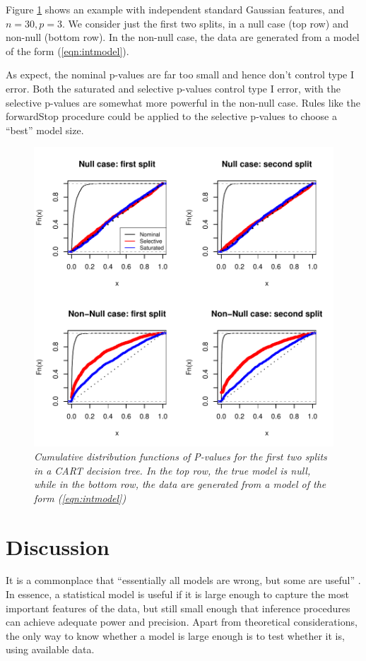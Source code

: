 \documentclass{article}
\begin{document}
Figure \ref{fig:cart} shows an example with independent standard Gaussian features, and $n=30, p=3$.
We 
consider just the first two splits, in a null case (top row) and non-null (bottom row).
In the non-null case,  the data are generated from a  model of the form (\ref{eqn:intmodel}).

As expect, the nominal p-values are far too small and hence don't control type I error.
Both the saturated and selective p-values control type I error, with the selective p-values are somewhat more powerful in the non-null case.
Rules like the forwardStop procedure could be applied  to the selective p-values to choose a ``best'' model size.
\begin{figure}[h]
  \centering
  \includegraphics[width=.65\textwidth]{figs/cart.pdf}
  \caption{\em Cumulative distribution functions of P-values for  the first two splits in a CART decision tree. In the top row, the true model is null,
  while in the bottom row, the data are generated from a  model of the form (\ref{eqn:intmodel})}
  \label{fig:cart}
\end{figure}

\section{Discussion}
\label{sec:pca}

It is a commonplace that ``essentially all models are wrong, but some are useful'' \citep{box1987empirical}. In essence, a statistical model is useful if it is large enough to capture the most important features of the data, but still small enough that inference procedures can achieve adequate power and precision. Apart from theoretical considerations, the only way to know whether a model is large enough is to test whether it is, using available data.
\end{document}
